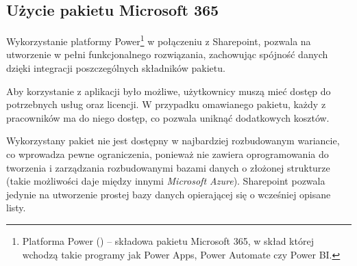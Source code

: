 \subsection{Użycie pakietu Microsoft 365}
\begin{comment}


Wykorzystanie platformy Power\footnote{Platforma Power (\english{Power Platform}) -- Składowa pakietu Microsoft 365. Zawiera ona takie programy jak Power Apps, Power Automate czy Power BI.} w połączeniu z Sharepoint, pozwala na utworzenie w pełni funkcjonalnego rozwiązania, zachowując spójność danych dzięki integracji poszczególnych składników pakietu.

Aby korzystanie z aplikacji było możliwe, użytkownicy muszą mieć dostęp do potrzebnych usług oraz licencje. W przypadku omawianego pakietu, każdy z pracowników, ma do niego dostęp. Pozwala to na uniknięcie dodatkowych kosztów.

Niestety użyty pakiet, nie jest dostępny w najbardziej rozbudowanym wariancie. Wprowadza to pewne ograniczenia, ponieważ brakuje w nim oprogramowania do tworzenia i zarządzania rozbudowanymi bazami danych o złożonej strukturze (takie możliwości daje między innymi \emph{Microsoft Azure}).
Sharepoint pozwala jedynie na utworzenie prostej bazy danych opierającej się o wcześniej opisane listy.  Głównym problemem było ograniczenie związane z brakiem możliwości tworzenia relacji między kilkoma listami, co znacząco utrudniało zarządzanie danymi o złożonej strukturze.

\end{comment}

Wykorzystanie platformy Power\footnote{Platforma Power () -- składowa pakietu Microsoft 365, w skład której wchodzą takie programy jak Power Apps, Power Automate czy Power BI.} w połączeniu z Sharepoint, pozwala na utworzenie w pełni funkcjonalnego rozwiązania, zachowując spójność danych dzięki integracji poszczególnych składników pakietu.

Aby korzystanie z aplikacji było możliwe, użytkownicy muszą mieć dostęp do potrzebnych usług oraz licencji. W przypadku omawianego pakietu, każdy z pracowników ma do niego dostęp, co pozwala uniknąć dodatkowych kosztów.

Wykorzystany pakiet nie jest dostępny w najbardziej rozbudowanym wariancie, co wprowadza pewne ograniczenia, ponieważ nie zawiera oprogramowania do tworzenia i zarządzania rozbudowanymi bazami danych o złożonej strukturze (takie możliwości daje między innymi \emph{Microsoft Azure}).
Sharepoint pozwala jedynie na utworzenie prostej bazy danych opierającej się o wcześniej opisane listy.


